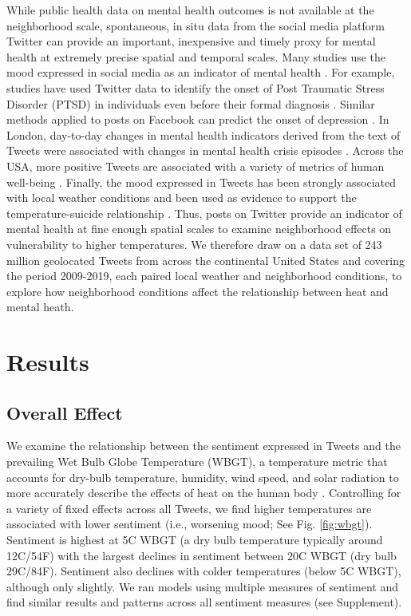 \documentclass[fleqn,10pt]{wlscirep}
\begin{document}
While public health data on mental health outcomes is not available at the neighborhood scale, spontaneous, in situ data from the social media platform Twitter can provide an important, inexpensive and timely proxy for mental health at extremely precise spatial and temporal scales. Many studies use the mood expressed in social media as an indicator of mental health \cite{Edo-Osagie2020Jul, Sinnenberg2016Dec}. For example, studies have used Twitter data to identify the onset of Post Traumatic Stress Disorder (PTSD) in individuals even before their formal diagnosis \cite{Reece2017Oct}. Similar methods applied to posts on Facebook can predict the onset of depression \cite{Eichstaedt2018Oct}. In London, day-to-day changes in mental health indicators derived from the text of Tweets were associated with changes in mental health crisis episodes \cite{Kolliakou2020Feb}. Across the USA, more positive Tweets are associated with a variety of metrics of human well-being \cite{Mitchell2013May}. Finally, the mood expressed in Tweets has been strongly associated with local weather conditions \cite{baylis_weather_2018, hannak_tweetin_2012} and been used as evidence to support the temperature-suicide relationship \cite{Burke2018Aug}. Thus, posts on Twitter provide an indicator of mental health at fine enough spatial scales to examine neighborhood effects on vulnerability to higher temperatures. We therefore draw on a data set of 243 million geolocated Tweets from across the continental United States and covering the period 2009-2019, each paired local weather and neighborhood conditions, to explore how neighborhood conditions affect the relationship between heat and mental heath.

\section*{Results}

\subsection*{Overall Effect}
We examine the relationship between the sentiment expressed in Tweets and the prevailing Wet Bulb Globe Temperature (WBGT), a temperature metric that accounts for dry-bulb temperature, humidity, wind speed, and solar radiation to more accurately describe the effects of heat on the human body \cite{budd2008wet}. Controlling for a variety of fixed effects across all Tweets, we find higher temperatures are associated with lower sentiment (i.e., worsening mood; See Fig. \ref{fig:wbgt}).  Sentiment is highest at 5\textdegree C WBGT (a dry bulb temperature typically around 12\textdegree C/54\textdegree F) with the largest declines in sentiment between 20\textdegree C WBGT (dry bulb 29\textdegree C/84\textdegree F). Sentiment also declines with colder temperatures (below 5\textdegree C WBGT), although only slightly. We ran models using multiple measures of sentiment and find similar results and patterns across all sentiment measures (see Supplement).
\end{document}
